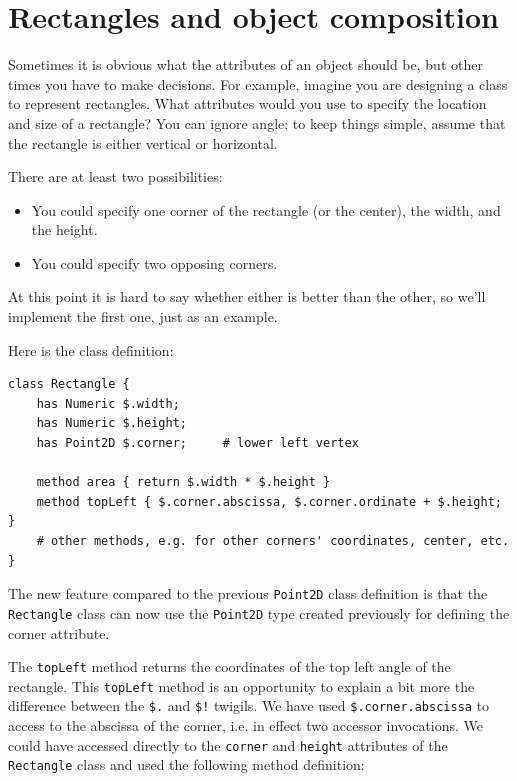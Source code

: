 \section{Rectangles and object composition}
\label{rectangles}

Sometimes it is obvious what the attributes of an object should be,
but other times you have to make decisions.  For example, imagine you
are designing a class to represent rectangles.  What attributes would
you use to specify the location and size of a rectangle?  You can
ignore angle; to keep things simple, assume that the rectangle is
either vertical or horizontal.

There are at least two possibilities: 

\begin{itemize}

\item You could specify one corner of the rectangle
(or the center), the width, and the height.

\item You could specify two opposing corners.

\end{itemize}

At this point it is hard to say whether either is better than
the other, so we'll implement the first one, just as an example.

Here is the class definition:

\begin{verbatim}
class Rectangle {
    has Numeric $.width;
    has Numeric $.height;
    has Point2D $.corner;     # lower left vertex 

    method area { return $.width * $.height }
    method topLeft { $.corner.abscissa, $.corner.ordinate + $.height; }
    # other methods, e.g. for other corners' coordinates, center, etc.
}
\end{verbatim}
%
The new feature compared to the previous {\tt Point2D} class 
definition is that the {\tt Rectangle} class can now use the 
{\tt Point2D} type created previously for defining the corner 
attribute. 

The {\tt topLeft} method returns the coordinates of 
the top left angle of the rectangle. This {\tt topLeft} 
method is an opportunity to explain a bit more 
the difference between the \verb'$.' and \verb'$!' twigils. We have 
used \verb'$.corner.abscissa' to access to the abscissa of 
the corner, i.e. in effect two accessor invocations. We could 
have accessed directly to the {\tt corner} and {\tt height} 
attributes of the {\tt Rectangle} class and used the following 
method definition:

